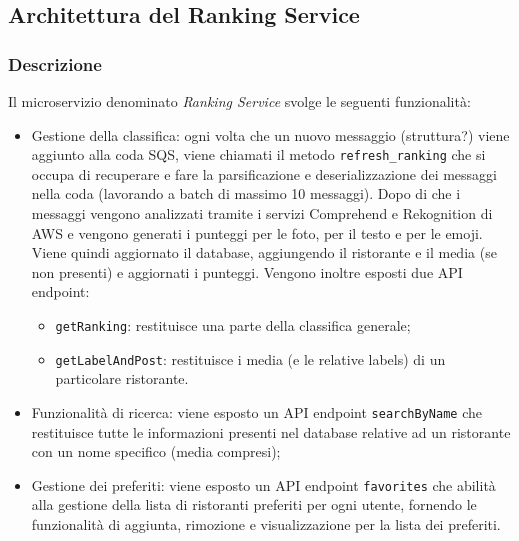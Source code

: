 \subsection{Architettura del Ranking Service}
\subsubsection{Descrizione}
Il microservizio denominato \textit{Ranking Service} svolge le seguenti funzionalità:
\begin{itemize}
	\item Gestione della classifica: ogni volta che un nuovo messaggio (struttura?) viene aggiunto alla coda SQS, viene chiamati il metodo \texttt{refresh\_ranking} che si occupa di recuperare e fare la parsificazione e deserializzazione dei messaggi nella coda (lavorando a batch di massimo 10 messaggi). Dopo di che i messaggi vengono analizzati tramite i servizi Comprehend e Rekognition di AWS e vengono generati i punteggi per le foto, per il testo e per le emoji. Viene quindi aggiornato il database, aggiungendo il ristorante e il media (se non presenti) e aggiornati i punteggi.
	Vengono inoltre esposti due API endpoint:
		\begin{itemize}
			\item \texttt{getRanking}: restituisce una parte della classifica generale;
			\item \texttt{getLabelAndPost}: restituisce i media (e le relative labels) di un particolare ristorante.
		\end{itemize}
	\item Funzionalità di ricerca: viene esposto un API endpoint \texttt{searchByName} che restituisce tutte le informazioni presenti nel database relative ad un ristorante con un nome specifico (media compresi); 
	\item Gestione dei preferiti: viene esposto un API endpoint \texttt{favorites} che abilità alla gestione della lista di ristoranti preferiti per ogni utente, fornendo le funzionalità di aggiunta, rimozione e visualizzazione per la lista dei preferiti.
\end{itemize}

